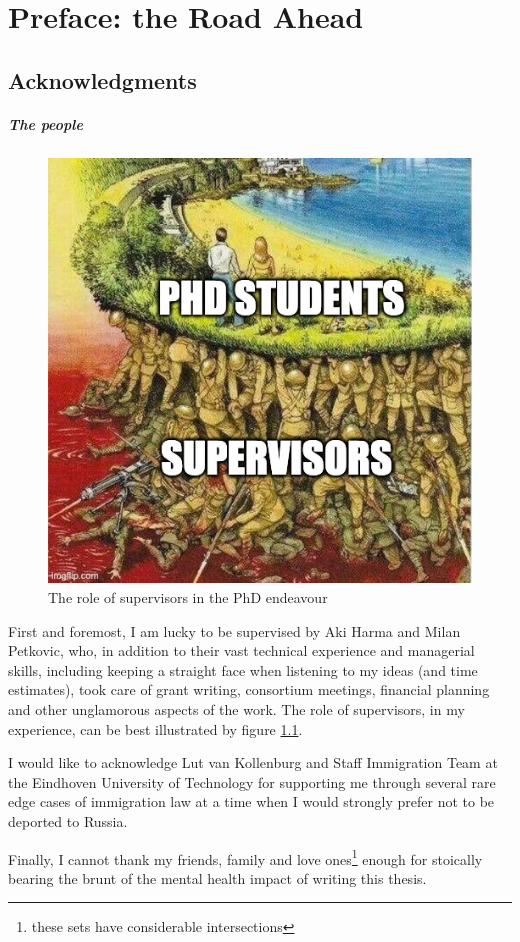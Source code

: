 \chapter{Preface: the Road Ahead}
\label{ch:preface}

\section{Acknowledgments}

\paragraph{The people}

\begin{figure}
    \centering
    \includegraphics[width=0.55\linewidth]{images/soldiers_meme.jpg}
    \caption{The role of supervisors in the PhD endeavour}
    \label{fig:soldiers-meme}
\end{figure}

First and foremost, I am lucky to be supervised by Aki Harma and Milan Petkovic, who, in addition to their vast technical experience and managerial skills, including keeping a straight face when listening to my ideas (and time estimates), took care of grant writing, consortium meetings, financial planning and other unglamorous aspects of the work.
The role of supervisors, in my experience, can be best illustrated by figure \ref{fig:soldiers-meme}.

I would like to acknowledge Lut van Kollenburg and Staff Immigration Team at the Eindhoven University of Technology for supporting me through several rare edge cases of immigration law at a time when I would strongly prefer not to be deported to Russia. 

Finally, I cannot thank my friends, family and love ones\footnote{these sets have considerable intersections} enough for stoically bearing the brunt of the mental health impact of writing this thesis.

